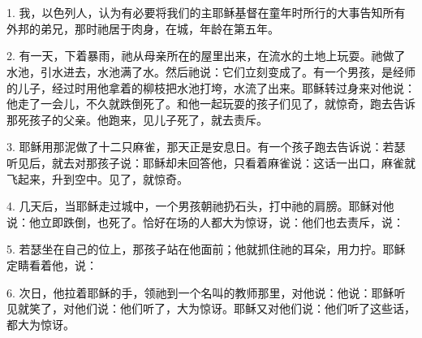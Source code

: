 
\section{}

\par

1. 我，以色列人，认为有必要将我们的主耶稣基督在童年时所行的大事告知所有外邦的弟兄，那时祂居于肉身，在城，年龄在第五年。\par

2. 有一天，下着暴雨，祂从母亲所在的屋里出来，在流水的土地上玩耍。祂做了水池，引水进去，水池满了水。然后祂说：它们立刻变成了。有一个男孩，是经师的儿子，经过时用他拿着的柳枝把水池打垮，水流了出来。耶稣转过身来对他说：他走了一会儿，不久就跌倒死了。和他一起玩耍的孩子们见了，就惊奇，跑去告诉那死孩子的父亲。他跑来，见儿子死了，就去责斥。\par

3. 耶稣用那泥做了十二只麻雀，那天正是安息日。有一个孩子跑去告诉说：若瑟听见后，就去对那孩子说：耶稣却未回答他，只看着麻雀说：这话一出口，麻雀就飞起来，升到空中。见了，就惊奇。\par

4. 几天后，当耶稣走过城中，一个男孩朝祂扔石头，打中祂的肩膀。耶稣对他说：他立即跌倒，也死了。恰好在场的人都大为惊讶，说：他们也去责斥，说：\par

5. 若瑟坐在自己的位上，那孩子站在他面前；他就抓住祂的耳朵，用力拧。耶稣定睛看着他，说：\par

6. 次日，他拉着耶稣的手，领祂到一个名叫的教师那里，对他说：他说：耶稣听见就笑了，对他们说：他们听了，大为惊讶。耶稣又对他们说：他们听了这些话，都大为惊讶。\par

